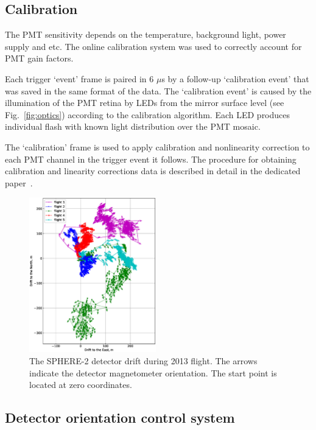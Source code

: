 \documentclass[final,5p,times,twocolumn]{elsarticle}
\begin{document}
\subsection{Calibration}
The PMT sensitivity depends on the temperature, background light, power supply and etc. The online calibration system was used to correctly account for PMT gain factors.

Each trigger `event' frame is paired in 6 $\mu$s by a follow-up `calibration event' that was saved in the same format of the data. The `calibration event' is caused by the illumination of the PMT retina by LEDs from the mirror surface level (see Fig.~\ref{fig:optics}) according to the calibration algorithm. Each LED produces individual flash with known light distribution over the PMT mosaic. 

The `calibration' frame is used to apply calibration and nonlinearity correction to each PMT channel in the trigger event it follows. The procedure for obtaining calibration and linearity corrections data is described in detail in the dedicated paper~\cite{ant16}. 

\begin{figure}[tb]
\includegraphics[width=0.49\textwidth]{figs/GPS+quiver.eps}\hspace{2pc}%
\caption{The SPHERE-2 detector drift during 2013 flight. The arrows indicate the detector magnetometer orientation. The start point is located at zero coordinates.}
\label{fig:gps_compass}
\end{figure}


\subsection{Detector orientation control system}
\end{document}
